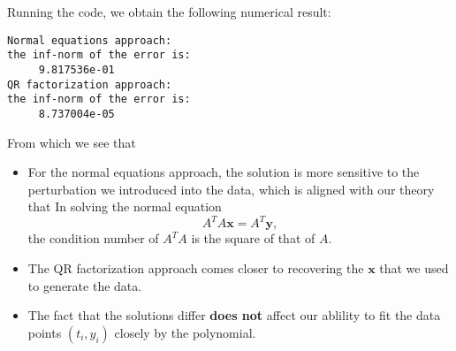 \begin{multicols}{2}
\begin{sol}
      Running the code,
      we obtain the following numerical result:
\begin{verbatim}
Normal equations approach: 
the inf-norm of the error is: 
     9.817536e-01
QR factorization approach: 
the inf-norm of the error is: 
     8.737004e-05
\end{verbatim}
      From which we see that
      \begin{itemize}
        \item
      For the normal equations approach,
      the solution is more sensitive to the perturbation we introduced into the data,
      which is aligned with our theory that In solving the normal equation
      \begin{displaymath}
        A^TA\bm{x} = A^T\bm{y},
      \end{displaymath}
      the condition number of
      $A^TA$ is the square of that of $A$.
      \item
      The QR factorization approach comes closer to recovering the $\bm{x}$
      that we used to generate the data.
    \item
      The fact that the solutions differ \textbf{does not} affect our ablility
      to fit the data points $(t_i, y_i)$ closely by the polynomial.
    \end{itemize}
  \end{sol}
  \end{multicols}
